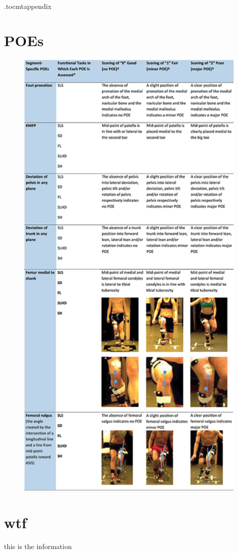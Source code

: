 \newpage
\appendix
\newpage
\etocdepthtag.toc{mtappendix}
\tableofcontents
\newpage


\chapter{POEs}
\begin{figure}[b]
  \centering
  \includegraphics[height=\textheight]{files/figs/poes-detailed-rot.png}
  \label{}
\end{figure}


\chapter{wtf}
this is the information
